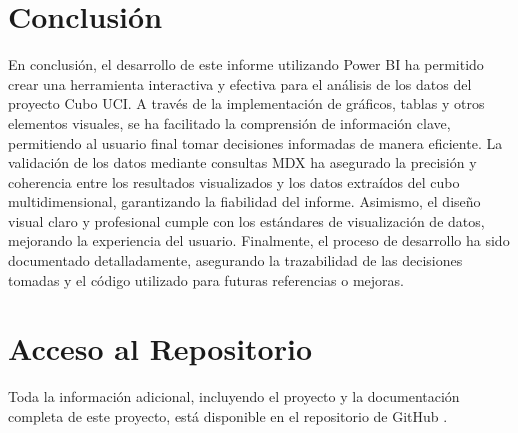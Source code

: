 \documentclass{article}
\begin{document}
 \section{Conclusión}
	 \label{sec:conclusion}
	 
	En conclusión, el desarrollo de este informe utilizando Power BI ha permitido crear una herramienta interactiva y efectiva para el análisis de los datos del proyecto Cubo UCI. A través de la implementación de gráficos, tablas y otros elementos visuales, se ha facilitado la comprensión de información clave, permitiendo al usuario final tomar decisiones informadas de manera eficiente. La validación de los datos mediante consultas MDX ha asegurado la precisión y coherencia entre los resultados visualizados y los datos extraídos del cubo multidimensional, garantizando la fiabilidad del informe. Asimismo, el diseño visual claro y profesional cumple con los estándares de visualización de datos, mejorando la experiencia del usuario. Finalmente, el proceso de desarrollo ha sido documentado detalladamente, asegurando la trazabilidad de las decisiones tomadas y el código utilizado para futuras referencias o mejoras.
	 
	\newpage
	\section{Acceso al Repositorio}
	
	Toda la información adicional, incluyendo el proyecto y la documentación completa de este proyecto, está disponible en el repositorio de GitHub \cite{cuevas2025powerbi}.
	
	
\end{document}
